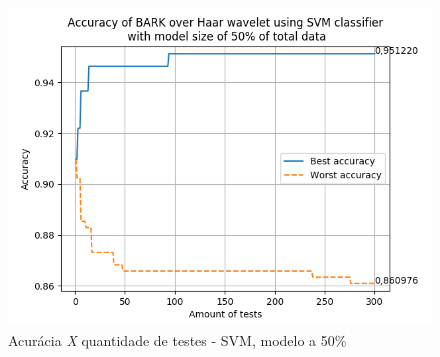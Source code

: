 \begin{myenv}{1.5}
		\newpage
		\begin{figure}[h]
			\centering
			\includegraphics{images/results/confusionMatrices/classifier_SVM_50.png}
			\caption{Acurácia \textit{X} quantidade de testes - SVM, modelo a 50\%}
			\label{fig:classifiersvm50}
		\end{figure}
		
		
	\end{myenv}

